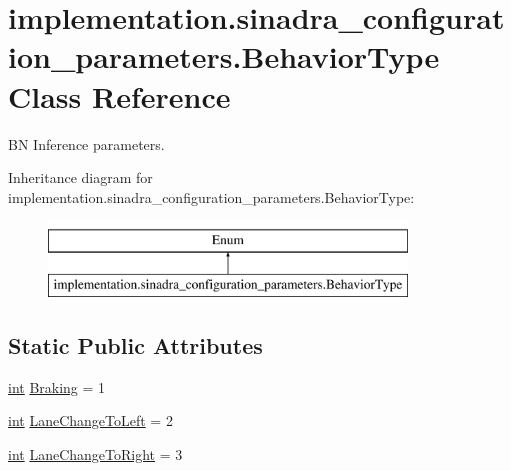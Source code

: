 \hypertarget{classimplementation_1_1sinadra__configuration__parameters_1_1_behavior_type}{}\section{implementation.\+sinadra\+\_\+configuration\+\_\+parameters.\+Behavior\+Type Class Reference}
\label{classimplementation_1_1sinadra__configuration__parameters_1_1_behavior_type}


BN Inference parameters.  


Inheritance diagram for implementation.\+sinadra\+\_\+configuration\+\_\+parameters.\+Behavior\+Type\+:\begin{figure}[H]
\begin{center}
\leavevmode
\includegraphics[height=2.000000cm]{classimplementation_1_1sinadra__configuration__parameters_1_1_behavior_type}
\end{center}
\end{figure}
\subsection*{Static Public Attributes}
\begin{DoxyCompactItemize}
\item 
\hyperlink{namespaceimplementation_1_1sinadra__configuration__parameters_a1053d4f6819fcba166f4cf443ab0123d}{int} \hyperlink{classimplementation_1_1sinadra__configuration__parameters_1_1_behavior_type_a067bea59d67bb5900eb8dbb35ad22deb}{Braking} = 1
\item 
\hyperlink{namespaceimplementation_1_1sinadra__configuration__parameters_a1053d4f6819fcba166f4cf443ab0123d}{int} \hyperlink{classimplementation_1_1sinadra__configuration__parameters_1_1_behavior_type_ac05e3aaf6d0f49dc7baca5efdd5f89e4}{Lane\+Change\+To\+Left} = 2
\item 
\hyperlink{namespaceimplementation_1_1sinadra__configuration__parameters_a1053d4f6819fcba166f4cf443ab0123d}{int} \hyperlink{classimplementation_1_1sinadra__configuration__parameters_1_1_behavior_type_a5a1cb89e84054858ec7dc07945b526bf}{Lane\+Change\+To\+Right} = 3
\end{DoxyCompactItemize}


